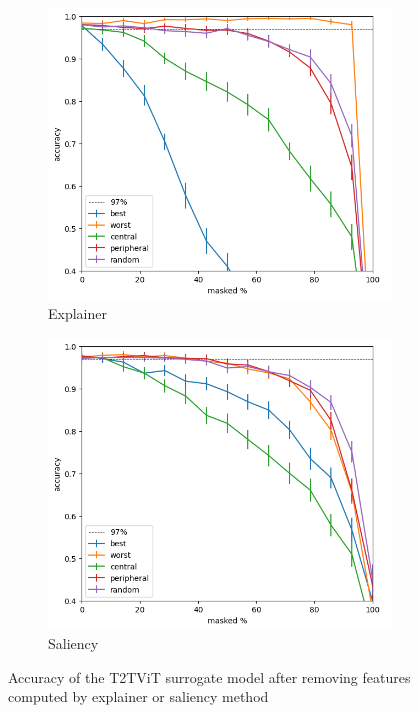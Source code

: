 \documentclass[magisterska,en]{pracamgr}
\begin{document}
\begin{figure}
\centering
\begin{subfigure}{.7\textwidth}
  \centering
  \includegraphics[width=.8\linewidth]{./images/masking_explainer_patches_accuracy_t2t_vit_half-0.png}
  \caption{Explainer}
  \label{fig:sub1}
\end{subfigure}%
\begin{subfigure}{.7\textwidth}
  \centering
  \includegraphics[width=.8\linewidth]
{./images/masking_saliency_patches_accuracy_t2t_vit_half-0.png}
  \caption{Saliency}
  \label{fig:sub2}
\end{subfigure}
\caption{Accuracy of the T2T\textunderscore ViT surrogate model after removing features computed by explainer or saliency method}
\label{fig:T2T_ViT_Saliency_Explainer_CIFAR}
\end{figure}
\end{document}
